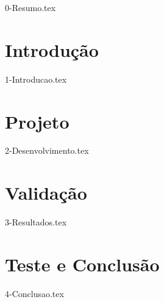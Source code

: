 \documentclass[a4paper, 10 pt, conference]{ieeeconf}
\begin{document}
    \maketitle
    {0-Resumo.tex}
    \section{Introdução}
        {1-Introducao.tex}
    \section{Projeto}
        {2-Desenvolvimento.tex}
    \section{Validação}
        {3-Resultados.tex}
    \section{Teste e Conclusão}
        {4-Conclusao.tex}
\end{document}
